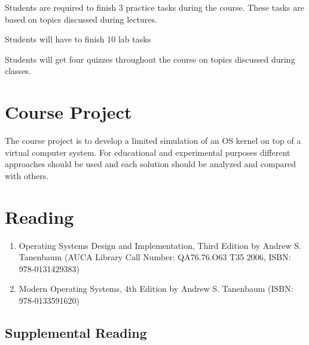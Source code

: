 \documentclass[12pt,a4paper,oneside]{article}
\begin{document}
        Students are required to finish 3 practice tasks during the course.
        These tasks are based on topics discussed during lectures.
        
        Students will have to finish 10 lab tasks 

        Students will get four quizzes throughout the course on topics discussed
        during classes.

    \section{Course Project}

        The course project is to develop a limited simulation of an OS kernel on
        top of a virtual computer system. For educational and experimental
        purposes different approaches should be used and each solution should be
        analyzed and compared with others.

    \section{Reading}
    
        \begin{enumerate}
            \item Operating Systems Design and Implementation, Third Edition by Andrew S.
            Tanenbaum (AUCA Library Call Number: QA76.76.O63 T35 2006, ISBN:
            978-0131429383)
            \item Modern Operating Systems, 4th Edition by Andrew S. Tanenbaum (ISBN: 978-0133591620)
        \end{enumerate}

        \subsection{Supplemental Reading}
        
\end{document}
